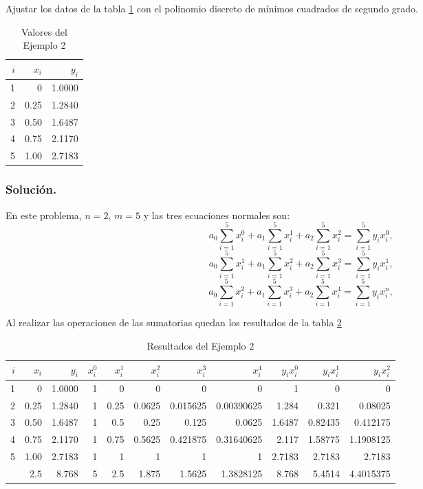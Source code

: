 \begin{exerciseT}
	Ajustar los datos de la tabla \ref{table:minimosCuadrados2} con el polinomio discreto de mínimos cuadrados de segundo grado.
    \begin{table}[H]
		\centering		
		\begin{tabular}{rrr}
			\toprule
			$i$ & $x_i$ & $y_i$\\\midrule
      		1 & 0 & 1.0000\\
     		2 & 0.25 & 1.2840\\
      		3 & 0.50 & 1.6487\\
      		4 & 0.75 & 2.1170\\
      		5 & 1.00 & 2.7183\\
	      	\bottomrule
		\end{tabular}
		\caption{Valores del Ejemplo 2}
		\label{table:minimosCuadrados2}
    \end{table}   
  \subsubsection*{Solución.} 
	En este problema, $n=2$, $m=5$ y las tres ecuaciones normales son:
	$$a_0\sum_{i=1}^5 x_i^0 + a_1\sum_{i=1}^5 x_i^1 + a_2\sum_{i=1}^5 x_i^2 = \sum_{i=1}^5 y_ix_i^0,$$
	$$a_0\sum_{i=1}^5 x_i^1 + a_1\sum_{i=1}^5 x_i^2 + a_2\sum_{i=1}^5 x_i^3 = \sum_{i=1}^5 y_ix_i^1,$$
	$$a_0\sum_{i=1}^5 x_i^2 + a_1\sum_{i=1}^5 x_i^3 + a_2\sum_{i=1}^5 x_i^4 = \sum_{i=1}^5 y_ix_i^n,$$
 
	Al realizar las operaciones de las sumatorias quedan los resultados de la tabla \ref{table:minimosCuadrados3}
	\begin{table}[H]
		\centering
	    \begin{tabular}{rrrrrrrrrrr}
	    	\toprule
	    	$i$ & $x_i$ & $y_i$ & $x_i^0$ & $x_i^1$ & $x_i^2$ & $x_i^3$ & $x_i^4$ & $y_ix_i^0$ & $y_ix_i^1$ & $y_ix_i^2$ \\
	      	\midrule
			1 & 0 & 1.0000 & 1 & 0 & 0 & 0 & 0 & 1 & 0 & 0\\
		  	2 & 0.25 & 1.2840 & 1 & 0.25 & 0.0625 & 0.015625 & 0.00390625 & 1.284 & 0.321 & 0.08025\\
			3 & 0.50 & 1.6487 & 1 & 0.5 & 0.25 & 0.125 & 0.0625 & 1.6487 & 0.82435 & 0.412175\\
		  	4 & 0.75 & 2.1170 & 1 & 0.75 & 0.5625 & 0.421875 & 0.31640625 & 2.117 & 1.58775 & 1.1908125\\
		  	5 & 1.00 & 2.7183 & 1 & 1 & 1 & 1 & 1 & 2.7183 & 2.7183 & 2.7183\\\bottomrule
		    & 2.5 & 8.768 & 5 & 2.5 & 1.875 & 1.5625 & 1.3828125 & 8.768 & 5.4514 & 4.4015375\\
	    \end{tabular}
	    \caption{Resultados del Ejemplo 2}
	    \label{table:minimosCuadrados3}
	\end{table}   
	

\end{exerciseT}
